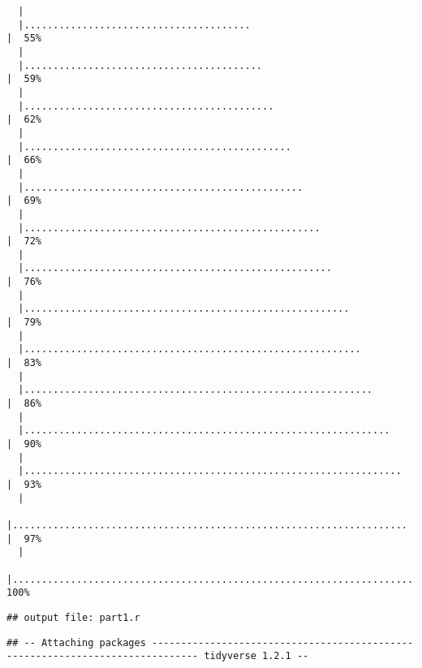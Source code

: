 \documentclass[]{article}
\begin{document}
\begin{verbatim}
  |                                                                            
  |.......................................                               |  55%
  |                                                                            
  |.........................................                             |  59%
  |                                                                            
  |...........................................                           |  62%
  |                                                                            
  |..............................................                        |  66%
  |                                                                            
  |................................................                      |  69%
  |                                                                            
  |...................................................                   |  72%
  |                                                                            
  |.....................................................                 |  76%
  |                                                                            
  |........................................................              |  79%
  |                                                                            
  |..........................................................            |  83%
  |                                                                            
  |............................................................          |  86%
  |                                                                            
  |...............................................................       |  90%
  |                                                                            
  |.................................................................     |  93%
  |                                                                            
  |....................................................................  |  97%
  |                                                                            
  |......................................................................| 100%
\end{verbatim}

\begin{verbatim}
## output file: part1.r
\end{verbatim}

\begin{verbatim}
## -- Attaching packages ------------------------------------------------------------------------------ tidyverse 1.2.1 --
\end{verbatim}
\end{document}
